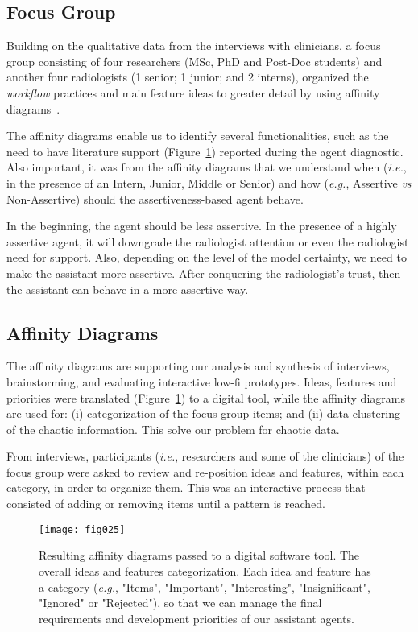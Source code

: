 \subsection{Focus Group}
\label{sec:sec00502}

Building on the qualitative data from the interviews with clinicians, a focus group consisting of four researchers (MSc, PhD and Post-Doc students) and another four radiologists (1 senior; 1 junior; and 2 interns), organized the {\it workflow} practices and main feature ideas to greater detail by using affinity diagrams~\cite{Hoiseth:2013:RGD:2468356.2468436}.

The affinity diagrams enable us to identify several functionalities, such as the need to have literature support (Figure~\ref{fig:fig025}) reported during the agent diagnostic.
Also important, it was from the affinity diagrams that we understand when ({\it i.e.}, in the presence of an Intern, Junior, Middle or Senior) and how ({\it e.g.}, Assertive {\it vs} Non-Assertive) should the assertiveness-based agent behave.

In the beginning, the agent should be less assertive.
In the presence of a highly assertive agent, it will downgrade the radiologist attention or even the radiologist need for support.
Also, depending on the level of the model certainty, we need to make the assistant more assertive.
After conquering the radiologist’s trust, then the assistant can behave in a more assertive way.

\subsection{Affinity Diagrams}
\label{sec:sec00503}

The affinity diagrams are supporting our analysis and synthesis of interviews, brainstorming, and evaluating interactive low-fi prototypes.
Ideas, features and priorities were translated (Figure~\ref{fig:fig025}) to a digital tool, while the affinity diagrams are used for: (i) categorization of the focus group items; and (ii) data clustering of the chaotic information.
This solve our problem for chaotic data.

From interviews, participants ({\it i.e.}, researchers and some of the clinicians) of the focus group were asked to review and re-position ideas and features, within each category, in order to organize them.
This was an interactive process that consisted of adding or removing items until a pattern is reached.

\begin{figure}[htbp]
\centering
\texttt{[image: fig025]}
\caption{Resulting affinity diagrams passed to a digital software tool. The overall ideas and features categorization. Each idea and feature has a category ({\it e.g.}, "Items", "Important", "Interesting", "Insignificant", "Ignored" or "Rejected"), so that we can manage the final requirements and development priorities of our assistant agents.}
\label{fig:fig025}
\end{figure}


